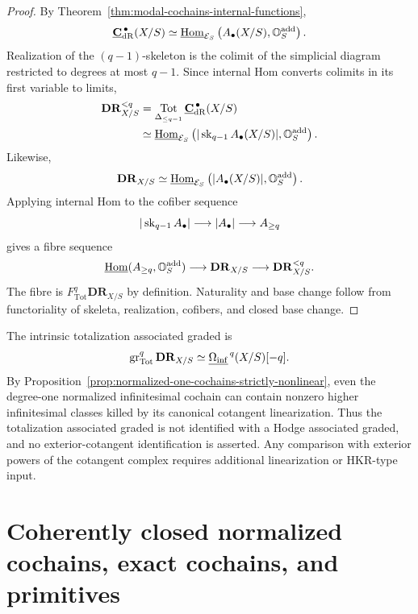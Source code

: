 \begin{proof}
By Theorem~\ref{thm:modal-cochains-internal-functions},
\[
    \underline{\mathbf C}_{\mathrm{dR}}^{\,\bullet}(X/S)
    \simeq
    \underline{\operatorname{Hom}}_{\mathcal E_S}
    \left(
        A_\bullet(X/S),\mathbb O_S^{\mathrm{add}}
    \right).
\]
Realization of the \((q-1)\)-skeleton is the colimit of the simplicial diagram restricted to
degrees at most \(q-1\).  Since internal Hom converts colimits in its first variable to limits,
\[
\begin{aligned}
    \mathbf{DR}_{X/S}^{<q}
    &=
    \operatorname*{Tot}_{\Delta_{\leq q-1}}
    \underline{\mathbf C}_{\mathrm{dR}}^{\,\bullet}(X/S)
    \\
    &\simeq
    \underline{\operatorname{Hom}}_{\mathcal E_S}
    \left(
        |\operatorname{sk}_{q-1}A_\bullet(X/S)|,
        \mathbb O_S^{\mathrm{add}}
    \right).
\end{aligned}
\]
Likewise,
\[
    \mathbf{DR}_{X/S}
    \simeq
    \underline{\operatorname{Hom}}_{\mathcal E_S}
    \left(
        |A_\bullet(X/S)|,
        \mathbb O_S^{\mathrm{add}}
    \right).
\]
Applying internal Hom to the cofiber sequence
\[
    |\operatorname{sk}_{q-1}A_\bullet|
    \longrightarrow
    |A_\bullet|
    \longrightarrow
    A_{\geq q}
\]
gives a fibre sequence
\[
    \underline{\operatorname{Hom}}(A_{\geq q},\mathbb O_S^{\mathrm{add}})
    \longrightarrow
    \mathbf{DR}_{X/S}
    \longrightarrow
    \mathbf{DR}_{X/S}^{<q}.
\]
The fibre is \(F_{\mathrm{Tot}}^q\mathbf{DR}_{X/S}\) by definition.  Naturality and base change follow from
functoriality of skeleta, realization, cofibers, and closed base change.
\end{proof}

\begin{remark}
The intrinsic totalization associated graded is
\[
    \operatorname{gr}_{\mathrm{Tot}}^q\mathbf{DR}_{X/S}
    \simeq
    \underline{\Omega_{\mathrm{inf}}}^{\,q}(X/S)[-q].
\]
By Proposition~\ref{prop:normalized-one-cochains-strictly-nonlinear}, even the degree-one
normalized infinitesimal cochain can contain nonzero higher infinitesimal classes killed by its
canonical cotangent linearization.  Thus the totalization associated graded is not identified with a
Hodge associated graded, and no exterior-cotangent identification is asserted.  Any comparison with
exterior powers of the cotangent complex requires additional linearization or HKR-type input.
\end{remark}


\section{Coherently closed normalized cochains, exact cochains, and primitives}
\label{sec:closed-forms-deloopings}

